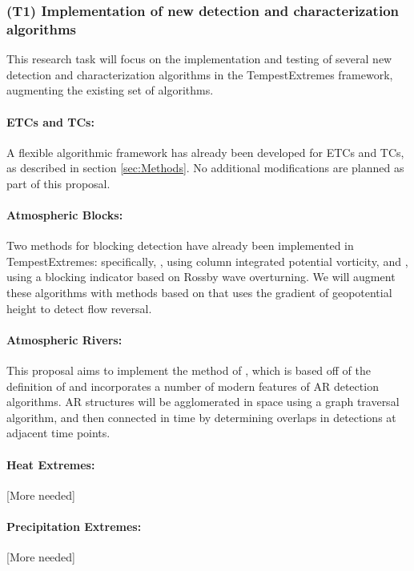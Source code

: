 \documentclass[11pt]{article}
\begin{document}
\subsubsection{(T1) Implementation of new detection and characterization algorithms} \label{sec:T1}

This research task will focus on the implementation and testing of several new detection and characterization algorithms in the TempestExtremes framework, augmenting the existing set of  algorithms.

\paragraph{ETCs and TCs:}  A flexible algorithmic framework has already been developed for ETCs and TCs, as described in section \ref{sec:Methods}.  No additional modifications are planned as part of this proposal.

\paragraph{Atmospheric Blocks:}  Two methods for blocking detection have already been implemented in TempestExtremes:  specifically, \cite{schwierz2004perspicacious}, using column integrated potential vorticity, and \cite{pelly2003new}, using a blocking indicator based on Rossby wave overturning.  We will augment these algorithms with methods based on \cite{tibaldi1990operational} that uses the gradient of geopotential height to detect flow reversal.

\paragraph{Atmospheric Rivers:}  This proposal aims to implement the method of \cite{jiang2014intermediate}, which is based off of the definition of \cite{ralph2004satellite} and incorporates a number of modern features of AR detection algorithms.  AR structures will be agglomerated in space using a graph traversal algorithm, and then connected in time by determining overlaps in detections at adjacent time points.

\paragraph{Heat Extremes:}  {\color{red} [More needed]}

\paragraph{Precipitation Extremes:}  {\color{red} [More needed]}
\end{document}
